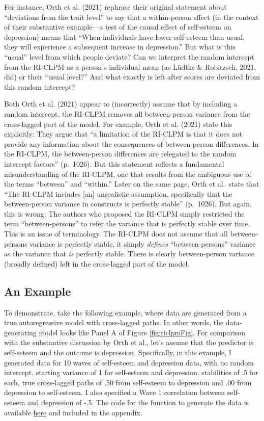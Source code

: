 \documentclass[
  english,
  man,floatsintext]{apa6}
\begin{document}
For instance, Orth et al. (2021) rephrase their original statement about ``deviations from the trait level'' to say that a within-person effect (in the context of their substantive example---a test of the causal effect of self-esteem on depression) means that ``When individuals have lower self-esteem than usual, they will experience a subsequent increase in depression.'' But what is this ``usual'' level from which people deviate? Can we interpret the random intercept from the RI-CLPM as a person's individual mean (as Lüdtke \& Robitzsch, 2021, did) or their ``usual level?'' And what exactly is left after scores are deviated from this random intercept?

Both Orth et al. (2021) appear to (incorrectly) assume that by including a random intercept, the RI-CLPM removes all between-person variance from the cross-lagged part of the model. For example, Orth et al. (2021) state this explicitly: They argue that ``a limitation of the RI-CLPM is that it does not provide any information about the consequences of between-person differences. In the RI-CLPM, the between-person differences are relegated to the random intercept factors'' (p.~1026). But this statement reflects a fundamental misunderstanding of the RI-CLPM, one that results from the ambiguous use of the terms ``between'' and ``within.'' Later on the same page, Orth et al.~state that ``The RI-CLPM includes {[}an{]} unrealistic assumption, specifically that the between-person variance in constructs is perfectly stable'' (p.~1026). But again, this is wrong: The authors who proposed the RI-CLPM simply restricted the term ``between-persons'' to refer the variance that is perfectly stable over time. This is an issue of terminology. The RI-CLPM does not assume that all between-persons variance is perfectly stable, it simply \emph{defines} ``between-persons'' variance as the variance that \emph{is} perfectly stable. There is clearly between-person variance (broadly defined) left in the cross-lagged part of the model.

\hypertarget{an-example}{%
\subsection{An Example}\label{an-example}}

To demonstrate, take the following example, where data are generated from a true autoregressive model with cross-lagged paths. In other words, the data-generating model looks like Panel A of Figure \ref{fig:riclpmFig}. For comparison with the substantive discussion by Orth et al., let's assume that the predictor is self-esteem and the outcome is depression. Specifically, in this example, I generated data for 10 waves of self-esteem and depression data, with no random intercept, starting variance of 1 for self-esteem and depression, stabilities of .5 for each, true cross-lagged paths of .50 from self-esteem to depression and .00 from depression to self-esteem. I also specified a Wave 1 correlation between self-esteem and depression of -.5. The code for the function to generate the data is available \href{https://github.com/rlucas11/starts/blob/main/gen_starts.R}{here} and included in the appendix.
\end{document}
